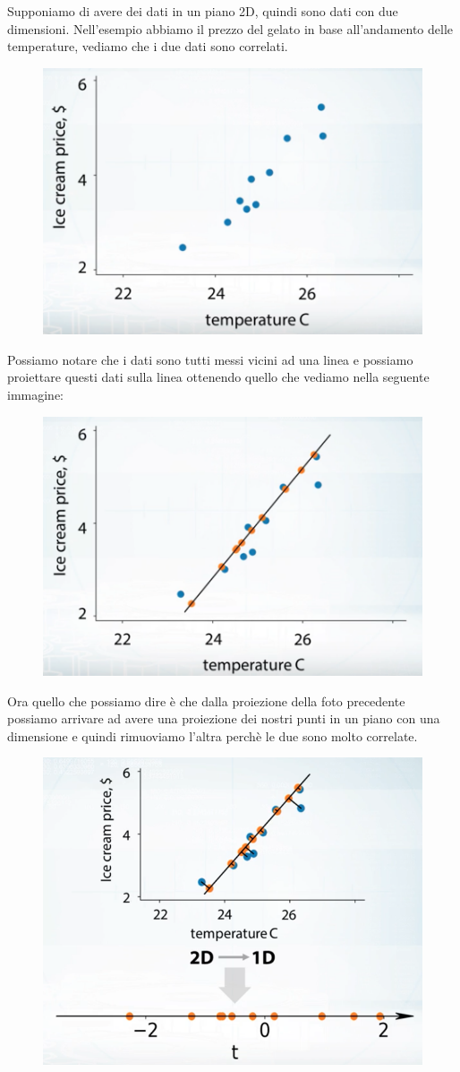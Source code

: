 \documentclass[14pt]{extreport}
\begin{document}
Supponiamo di avere dei dati in un piano 2D, quindi sono dati con due dimensioni. Nell'esempio abbiamo il prezzo del gelato in base all'andamento
delle temperature, vediamo che i due dati sono correlati.

\begin{figure}[H]
	\centering
	\includegraphics[width=0.7\linewidth]{571.jpeg}
\end{figure}

Possiamo notare che i dati sono tutti messi vicini ad una linea e possiamo proiettare questi dati sulla linea ottenendo quello che vediamo nella
seguente immagine:

\begin{figure}[H]
	\centering
	\includegraphics[width=0.7\linewidth]{572.jpeg}
\end{figure}

Ora quello che possiamo dire è che dalla proiezione della foto precedente possiamo arrivare ad avere una proiezione dei nostri punti in un piano con
una dimensione e quindi rimuoviamo l'altra perchè le due sono molto correlate.

\begin{figure}[H]
	\centering
	\includegraphics[width=0.7\linewidth]{573.jpeg}
\end{figure}
\end{document}
